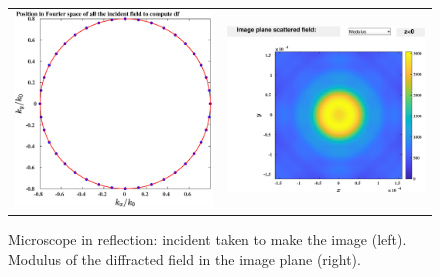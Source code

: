 \begin{figure}[H]
\begin{center}
\begin{tabular}{cc}
 \includegraphics*[width=7.0cm,draft=false]{test4angleincdf.eps}
&  \includegraphics*[width=7.0cm,draft=false]{test4imagewf.eps}
\end{tabular}

\end{center}
\caption{Microscope in reflection: incident taken to make the image
  (left). Modulus of the diffracted field in the image plane (right).}
\end{figure}
